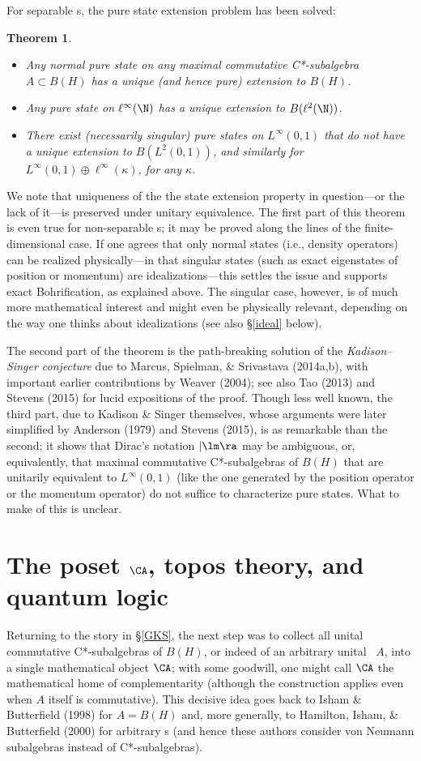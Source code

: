 \documentclass[12pt]{article}
\newtheorem{Theorem}[Definition]{Theorem}
\begin{document}
  For separable \Hs s, the pure state extension problem has been  solved:
  \begin{Theorem}\label{KSTheorem12}
\begin{itemize}
\item Any \emph{normal} pure state on any maximal commutative C*-subalgebra $A\subset B(H)$ has a unique (and hence pure) extension to $B(H)$.
\item Any pure state on $\ell^{\infty}(\N)$ has a unique extension to $ B(\ell^2(\N))$.
\item There exist (necessarily singular) pure states on $L^{\infty}(0,1)$ that do not have a unique extension to $B(L^2(0,1))$, and similarly for $L^{\infty}(0,1)\oplus \ell^{\infty}(\kappa)$, for any $\kappa$. 
\end{itemize} 
\end{Theorem}
We note 
that uniqueness of the the state extension property in question---or the lack of it---is preserved under unitary equivalence.
The first part of this theorem is even true for non-separable \Hs s; it may be proved along the lines of the finite-dimensional case. If one agrees that only normal states (i.e., density operators) can be realized physically---in that singular states (such as exact eigenstates of position or momentum) are idealizations---this settles the issue and supports exact Bohrification, as explained above. The singular case, however, is of much more mathematical interest and might even be physically relevant, depending on the way one thinks about idealizations (see also \S\ref{ideal} below).

 The second part of the theorem is the path-breaking solution of the \emph{Kadison--Singer conjecture} due to Marcus, Spielman,  \& Srivastava (2014a,b), with important earlier contributions by Weaver (2004);  see also Tao (2013) and Stevens (2015) for lucid expositions of the proof. Though less well known, the third part, due to Kadison \& Singer themselves, whose arguments were later simplified by Anderson (1979) and  Stevens (2015), is as  remarkable than the second; it shows that Dirac's notation $|\lm\ra$ may be ambiguous, or, equivalently, that  maximal commutative C*-subalgebras of $B(H)$ that are unitarily equivalent to $L^{\infty}(0,1)$ (like the one generated by the position operator or the momentum operator) do not suffice to characterize pure states. What to make of this is unclear. 
  \section{The poset $\CA$, topos theory, and quantum logic}
  Returning to the story in \S\ref{GKS}, the next step was to collect all unital  commutative C*-subalgebras of $B(H)$, or indeed of an arbitrary unital
   \ca\ $A$, into a single mathematical object $\CA$; with some goodwill, one might call $\CA$ the mathematical home of complementarity (although the construction applies even when $A$ itself is commutative). This decisive idea goes back to  Isham \& Butterfield (1998) for $A=B(H)$ and, more generally, to Hamilton, Isham, \& Butterfield (2000) for arbitrary \vna s (and hence these authors consider  von Neumann subalgebras instead of C*-subalgebras).
   
\end{document}
